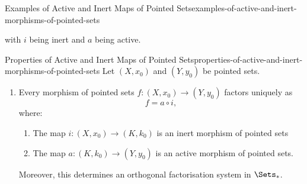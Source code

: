 \begin{example}{Examples of Active and Inert Maps of Pointed Sets}{examples-of-active-and-inert-morphisms-of-pointed-sets}
\begin{enumerate}
\begin{webcompile}
            \end{webcompile}
            with $i$ being inert and $a$ being active.
    \end{enumerate}
\end{example}
\begin{proposition}{Properties of Active and Inert Maps of Pointed Sets}{properties-of-active-and-inert-morphisms-of-pointed-sets}%
    Let $(X,x_{0})$ and $(Y,y_{0})$ be pointed sets.
    \begin{enumerate}
        \item\label{properties-of-active-and-inert-morphisms-of-pointed-sets-active-inert-factorisation}Every morphism of pointed sets $f\colon(X,x_{0})\to(Y,y_{0})$ factors uniquely as
            \[
                f%
                =%
                a\circ i,%
            \]%
            where:
            \begin{enumerate}
                \item\label{properties-of-active-and-inert-morphisms-of-pointed-sets-active-inert-factorisation-1}The map $i\colon(X,x_{0})\to(K,k_{0})$ is an inert morphism of pointed sets
                \item\label{properties-of-active-and-inert-morphisms-of-pointed-sets-active-inert-factorisation-2}The map $a\colon(K,k_{0})\to(Y,y_{0})$ is an active morphism of pointed sets.
            \end{enumerate}
            Moreover, this determines an orthogonal factorisation system in $\Sets_{*}$.
    \end{enumerate}
\end{proposition}
